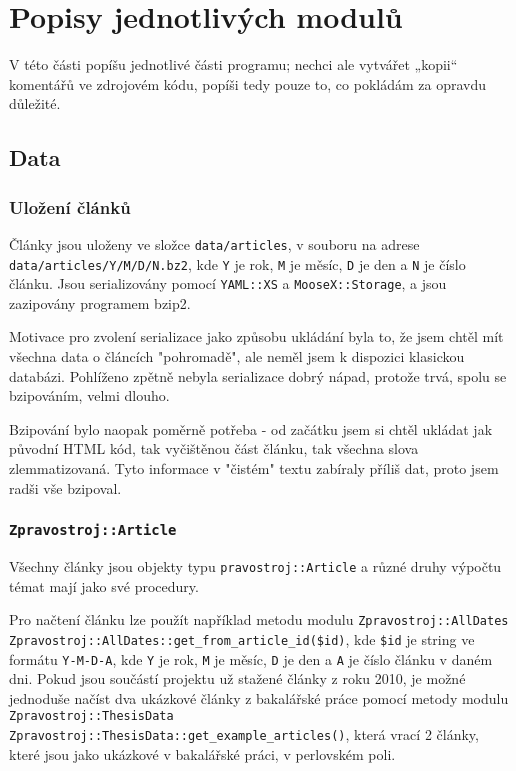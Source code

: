 \documentclass[12pt,a4paper]{report}
\def\uv#1{„#1“}
\begin{document}
\chapter{Popisy jednotlivých modulů}

V této části popíšu jednotlivé části programu; nechci ale vytvářet \uv{kopii} komentářů ve zdrojovém kódu, popíši tedy pouze to, co pokládám za opravdu důležité.

\section{Data}
		
\subsection{Uložení článků}
		
Články jsou uloženy ve složce \texttt{data/articles}, v souboru na adrese \texttt{data/articles/Y/M/D/N.bz2}, kde \texttt{Y} je rok, \texttt{M} je měsíc, \texttt{D} je den a \texttt{N} je číslo článku. Jsou serializovány pomocí \texttt{YAML::XS} a \texttt{MooseX::Storage}, a jsou zazipovány programem bzip2.

Motivace pro zvolení serializace jako způsobu ukládání byla to, že jsem chtěl mít všechna data o článcích "pohromadě", ale neměl jsem k dispozici klasickou databázi. Pohlíženo zpětně nebyla serializace dobrý nápad, protože trvá, spolu se bzipováním, velmi dlouho.

Bzipování bylo naopak poměrně potřeba - od začátku jsem si chtěl ukládat jak původní HTML kód, tak vyčištěnou část článku, tak všechna slova zlemmatizovaná. Tyto informace v "čistém" textu zabíraly příliš dat, proto jsem radši vše bzipoval.

\subsection{\texttt{Zpravostroj::Article}}

Všechny články jsou objekty typu \texttt{pravostroj::Article} a různé druhy výpočtu témat mají jako své procedury.

Pro načtení článku lze použít například metodu modulu \texttt{Zpravostroj::AllDates} \texttt{Zpravostroj::AllDates::get\_from\_article\_id(\$id)}, kde \texttt{\$id} je string ve formátu \texttt{Y-M-D-A}, kde \texttt{Y} je rok, \texttt{M} je měsíc, \texttt{D} je den a \texttt{A} je číslo článku v daném dni. Pokud jsou součástí projektu už stažené články z roku 2010, je možné jednoduše načíst dva ukázkové články z bakalářské práce pomocí metody modulu \texttt{Zpravostroj::ThesisData} \texttt{Zpravostroj::ThesisData::get\_example\_articles()}, která vrací 2 články, které jsou jako ukázkové v bakalářské práci, v perlovském poli.
\end{document}
